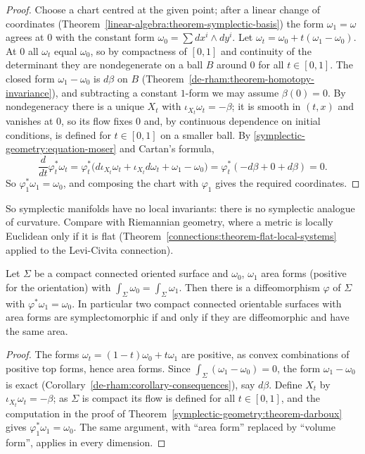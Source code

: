 \begin{proof}
Choose a chart centred at the given point; after a linear change of coordinates (Theorem~\ref{linear-algebra:theorem-symplectic-basis}) the form $\omega_1 = \omega$ agrees at $0$ with the constant form
$\omega_0 = \sum dx^i \wedge dy^i$. Let $\omega_t = \omega_0 + t(\omega_1 - \omega_0)$. At $0$ all $\omega_t$ equal $\omega_0$, so by compactness of $[0, 1]$ and continuity of the determinant they are
nondegenerate on a ball $B$ around $0$ for all $t \in [0, 1]$. The closed form $\omega_1 - \omega_0$ is $d\beta$ on $B$ (Theorem~\ref{de-rham:theorem-homotopy-invariance}), and subtracting a constant
$1$-form we may assume $\beta(0) = 0$. By nondegeneracy there is a unique $X_t$ with $\iota_{X_t}\omega_t = -\beta$; it is smooth in $(t, x)$ and vanishes at $0$, so its flow fixes $0$ and, by continuous
dependence on initial conditions, is defined for $t \in [0, 1]$ on a smaller ball. By \eqref{symplectic-geometry:equation-moser} and Cartan's formula,
\[
\frac{d}{dt}\varphi_t^*\omega_t = \varphi_t^*\bigl(d\iota_{X_t}\omega_t + \iota_{X_t}d\omega_t + \omega_1 - \omega_0\bigr) = \varphi_t^*(-d\beta + 0 + d\beta) = 0 .
\]
So $\varphi_1^*\omega_1 = \omega_0$, and composing the chart with $\varphi_1$ gives the required coordinates.
\end{proof}

So symplectic manifolds have no local invariants: there is no symplectic analogue of curvature. Compare with Riemannian geometry, where a metric is locally Euclidean only if it is flat
(Theorem~\ref{connections:theorem-flat-local-systems} applied to the Levi-Civita connection).

\begin{theorem}[Moser]\label{symplectic-geometry:theorem-moser-area}
Let $\Sigma$ be a compact connected oriented surface and $\omega_0$, $\omega_1$ area forms (positive for the orientation) with $\int_\Sigma\omega_0 = \int_\Sigma\omega_1$. Then there is a diffeomorphism
$\varphi$ of $\Sigma$ with $\varphi^*\omega_1 = \omega_0$. In particular two compact connected orientable surfaces with area forms are symplectomorphic if and only if they are diffeomorphic and have the same area.
\end{theorem}

\begin{proof}
The forms $\omega_t = (1 - t)\omega_0 + t\omega_1$ are positive, as convex combinations of positive top forms, hence area forms. Since $\int_\Sigma(\omega_1 - \omega_0) = 0$, the form $\omega_1 - \omega_0$ is
exact (Corollary~\ref{de-rham:corollary-consequences}), say $d\beta$. Define $X_t$ by $\iota_{X_t}\omega_t = -\beta$; as $\Sigma$ is compact its flow is defined for all $t \in [0, 1]$, and the computation in the
proof of Theorem~\ref{symplectic-geometry:theorem-darboux} gives $\varphi_1^*\omega_1 = \omega_0$. The same argument, with ``area form'' replaced by ``volume form'', applies in every dimension.
\end{proof}

